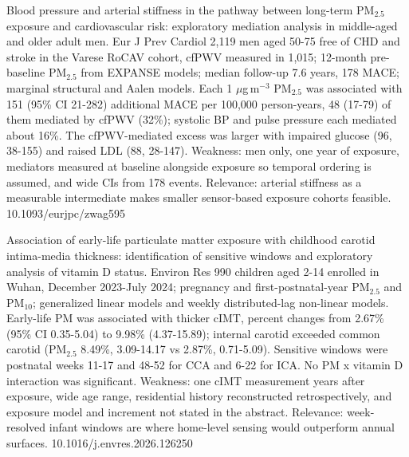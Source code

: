 \documentclass[10pt]{article}
\begin{document}
\par{}\baselineskip{}\baselineskip
{}

{Blood pressure and arterial stiffness in the pathway between long-term PM$_{2.5}$ exposure and cardiovascular risk: exploratory mediation analysis in middle-aged and older adult men.}
{Eur J Prev Cardiol}
{2,119 men aged 50-75 free of CHD and stroke in the Varese RoCAV cohort, cfPWV measured in 1,015; 12-month pre-baseline PM$_{2.5}$ from EXPANSE models; median follow-up 7.6 years, 178 MACE; marginal structural and Aalen models. Each 1 $\mu$g\,m$^{-3}$ PM$_{2.5}$ was associated with 151 (95\% CI 21-282) additional MACE per 100,000 person-years, 48 (17-79) of them mediated by cfPWV (32\%); systolic BP and pulse pressure each mediated about 16\%. The cfPWV-mediated excess was larger with impaired glucose (96, 38-155) and raised LDL (88, 28-147). Weakness: men only, one year of exposure, mediators measured at baseline alongside exposure so temporal ordering is assumed, and wide CIs from 178 events. Relevance: arterial stiffness as a measurable intermediate makes smaller sensor-based exposure cohorts feasible.}
{10.1093/eurjpc/zwag595}

{Association of early-life particulate matter exposure with childhood carotid intima-media thickness: identification of sensitive windows and exploratory analysis of vitamin D status.}
{Environ Res}
{990 children aged 2-14 enrolled in Wuhan, December 2023-July 2024; pregnancy and first-postnatal-year PM$_{2.5}$ and PM$_{10}$; generalized linear models and weekly distributed-lag non-linear models. Early-life PM was associated with thicker cIMT, percent changes from 2.67\% (95\% CI 0.35-5.04) to 9.98\% (4.37-15.89); internal carotid exceeded common carotid (PM$_{2.5}$ 8.49\%, 3.09-14.17 vs 2.87\%, 0.71-5.09). Sensitive windows were postnatal weeks 11-17 and 48-52 for CCA and 6-22 for ICA. No PM x vitamin D interaction was significant. Weakness: one cIMT measurement years after exposure, wide age range, residential history reconstructed retrospectively, and exposure model and increment not stated in the abstract. Relevance: week-resolved infant windows are where home-level sensing would outperform annual surfaces.}
{10.1016/j.envres.2026.126250}
\end{document}
